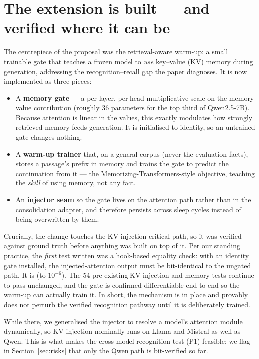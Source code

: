 \documentclass[11pt]{article}
\begin{document}
\section{The extension is built --- and verified where it can be}

The centrepiece of the proposal was the retrieval-aware warm-up: a small
trainable gate that teaches a frozen model to \emph{use} key--value (KV) memory
during generation, addressing the recognition--recall gap the paper diagnoses.
It is now implemented as three pieces:

\begin{itemize}
  \item A \textbf{memory gate} --- a per-layer, per-head multiplicative scale on
    the memory value contribution (roughly 36 parameters for the top third of
    Qwen2.5-7B). Because attention is linear in the values, this exactly
    modulates how strongly retrieved memory feeds generation. It is initialised
    to identity, so an untrained gate changes nothing.
  \item A \textbf{warm-up trainer} that, on a general corpus (never the
    evaluation facts), stores a passage's prefix in memory and trains the gate
    to predict the continuation from it --- the Memorizing-Transformers-style
    objective, teaching the \emph{skill} of using memory, not any fact.
  \item An \textbf{injector seam} so the gate lives on the attention path rather
    than in the consolidation adapter, and therefore persists across sleep
    cycles instead of being overwritten by them.
\end{itemize}

Crucially, the change touches the KV-injection critical path, so it was verified
against ground truth before anything was built on top of it. Per our standing
practice, the \emph{first} test written was a hook-based equality check: with an
identity gate installed, the injected-attention output must be bit-identical to
the ungated path. It is (to $10^{-6}$). The 54 pre-existing KV-injection and
memory tests continue to pass unchanged, and the gate is confirmed
differentiable end-to-end so the warm-up can actually train it. In short, the
mechanism is in place and provably does not perturb the verified recognition
pathway until it is deliberately trained.

While there, we generalised the injector to resolve a model's attention module
dynamically, so KV injection nominally runs on Llama and Mistral as well as
Qwen. This is what makes the cross-model recognition test (P1) feasible; we flag
in Section~\ref{sec:risks} that only the Qwen path is bit-verified so far.
\end{document}
